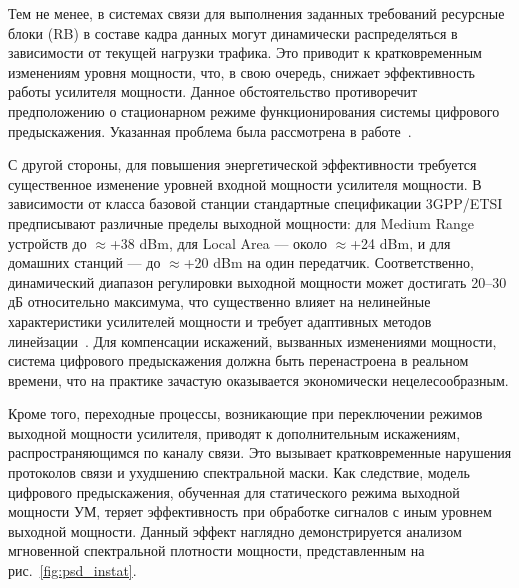 Тем не менее, в системах связи для выполнения заданных требований ресурсные блоки (RB) в составе кадра данных могут динамически распределяться в зависимости от текущей нагрузки трафика. Это приводит к кратковременным изменениям уровня мощности, что, в свою очередь, снижает эффективность работы усилителя мощности. Данное обстоятельство противоречит предположению о стационарном режиме функционирования системы цифрового предыскажения. Указанная проблема была рассмотрена в работе~\cite{Dynamic_DPD_RB_Alloc}.

С другой стороны, для повышения энергетической эффективности требуется существенное изменение уровней входной мощности усилителя мощности. В зависимости от класса базовой станции стандартные спецификации 3GPP/ETSI предписывают различные пределы выходной мощности: для Medium Range устройств до $\approx$+38 dBm, для Local Area — около $\approx$+24 dBm, и для домашних станций — до $\approx$+20 dBm на один передатчик. Соответственно, динамический диапазон регулировки выходной мощности может достигать 20–30 дБ относительно максимума, что существенно влияет на нелинейные характеристики усилителей мощности и требует адаптивных методов линейзации~\cite{etsi_ts_136104}. Для компенсации искажений, вызванных изменениями мощности, система цифрового предыскажения должна быть перенастроена в реальном времени, что на практике зачастую оказывается экономически нецелесообразным.

Кроме того, переходные процессы, возникающие при переключении режимов выходной мощности усилителя, приводят к дополнительным искажениям, распространяющимся по каналу связи. Это вызывает кратковременные нарушения протоколов связи и ухудшению спектральной маски. Как следствие, модель цифрового предыскажения, обученная для статического режима выходной мощности УМ, теряет эффективность при обработке сигналов с иным уровнем выходной мощности. Данный эффект наглядно демонстрируется анализом мгновенной спектральной плотности мощности, представленным на рис.~\ref{fig:psd_instat}.

